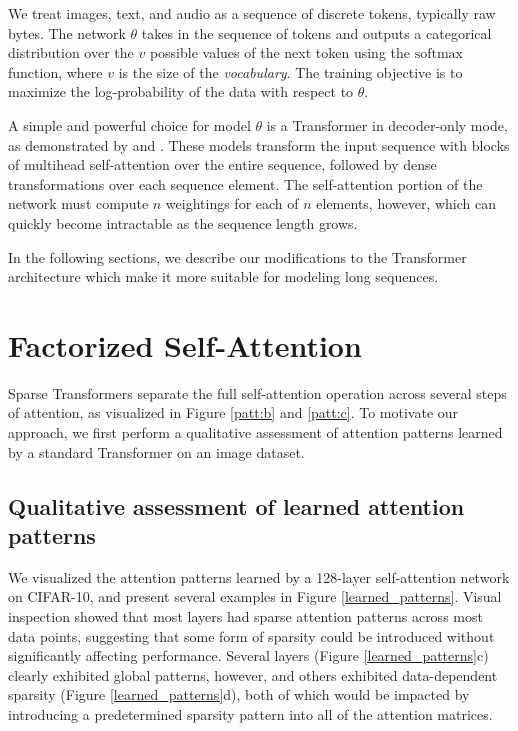 \documentclass{article}
\begin{document}
We treat images, text, and audio as a sequence of discrete tokens, typically raw bytes. The network $\theta$ takes in the sequence of tokens and outputs a categorical distribution over the $v$ possible values of the next token using the $\mathrm{softmax}$ function, where $v$ is the size of the \textit{vocabulary}. The training objective is to maximize the log-probability of the data with respect to $\theta$.

A simple and powerful choice for model $\theta$ is a Transformer \cite{vaswani2017attention} in decoder-only mode, as demonstrated by \cite{radford2018} and \cite{liu2018generating}. These models transform the input sequence with blocks of multihead self-attention over the entire sequence, followed by dense transformations over each sequence element. The self-attention portion of the network must compute $n$ weightings for each of $n$ elements, however, which can quickly become intractable as the sequence length grows.

In the following sections, we describe our modifications to the Transformer architecture which make it more suitable for modeling long sequences.

\section{Factorized Self-Attention}





Sparse Transformers separate the full self-attention operation across several steps of attention, as visualized in Figure \ref{patt:b} and \ref{patt:c}. To motivate our approach, we first perform a qualitative assessment of attention patterns learned by a standard Transformer on an image dataset.



\subsection{Qualitative assessment of learned attention patterns}
We visualized the attention patterns learned by a 128-layer self-attention network on CIFAR-10, and present several examples in Figure \ref{learned_patterns}. Visual inspection showed that most layers had sparse attention patterns across most data points, suggesting that some form of sparsity could be introduced without significantly affecting performance. Several layers (Figure \ref{learned_patterns}c) clearly exhibited global patterns, however, and others exhibited data-dependent sparsity (Figure \ref{learned_patterns}d), both of which would be impacted by introducing a predetermined sparsity pattern into all of the attention matrices.
\end{document}
